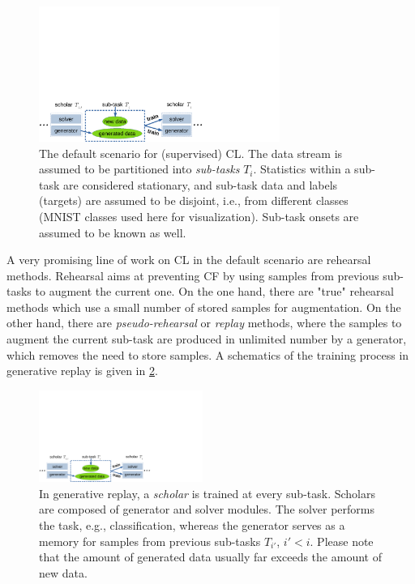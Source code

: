 \documentclass{article} %
\newcommand{\enquote}[1]{"#1"}
\begin{document}
\begin{figure}[b]
    \centering
    \includegraphics*[width=0.7\textwidth,page=4,viewport=0cm 0cm 14.3cm 5cm]{figs.pdf}
    \caption{The default scenario for (supervised) CL. The data stream is assumed to be partitioned into \textit{sub-tasks} $T_i$. Statistics within a sub-task are considered stationary, and sub-task data and labels (targets) are assumed to be disjoint, i.e., from different classes (MNIST classes used here for visualization). Sub-task onsets are assumed to be known as well.
    \label{fig:default}
    }
\end{figure}
%
A very promising line of work on CL in the default scenario are rehearsal methods. Rehearsal aims at preventing CF by using samples from previous sub-tasks to augment the current one. On the one hand, there are \enquote{true} rehearsal methods which use a small number of stored samples for augmentation. On the other hand, there are \textit{pseudo-rehearsal} or \textit{replay} methods, where the samples to augment the current sub-task are produced in unlimited number by a generator, which removes the need to store samples. A schematics of the training process in generative replay is given in \cref{fig:genrep}.
\begin{figure}[t]
    \centering
    \includegraphics*[height=3cm,page=1,viewport=0in 0in 7.5in 2in]{figs.pdf}
    \caption{In generative replay, a \textit{scholar} is trained at every sub-task. Scholars are composed of generator and solver modules. The solver performs the task, e.g., classification, whereas the generator serves as a memory for samples from previous sub-tasks $T_{i'}$, $i' < i$. Please note that the amount of generated data usually far exceeds the amount of new data. }
    \label{fig:genrep}
\end{figure}
\end{document}
